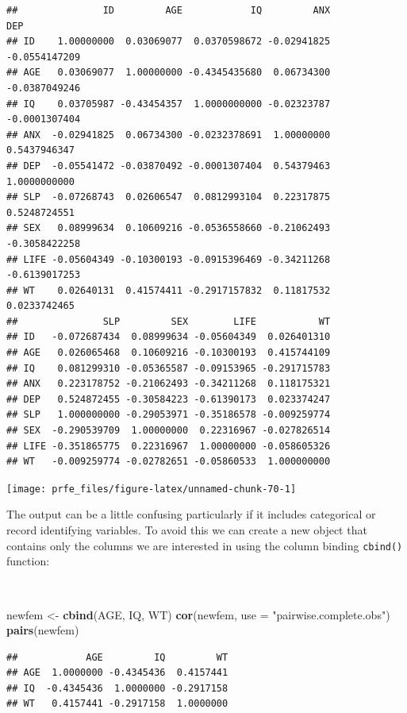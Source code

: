 \documentclass[12pt,a4paper]{book}
\newenvironment{Shaded}{\begin{snugshade}}{\end{snugshade}}
\newcommand{\DataTypeTok}[1]{\textcolor[rgb]{0.13,0.29,0.53}{#1}}
\newcommand{\KeywordTok}[1]{\textcolor[rgb]{0.13,0.29,0.53}{\textbf{#1}}}
\newcommand{\NormalTok}[1]{#1}
\newcommand{\StringTok}[1]{\textcolor[rgb]{0.31,0.60,0.02}{#1}}
\theoremstyle{definition}
\theoremstyle{definition}
\theoremstyle{definition}
\theoremstyle{remark}
\begin{document}
\begin{verbatim}
##               ID         AGE            IQ         ANX           DEP
## ID    1.00000000  0.03069077  0.0370598672 -0.02941825 -0.0554147209
## AGE   0.03069077  1.00000000 -0.4345435680  0.06734300 -0.0387049246
## IQ    0.03705987 -0.43454357  1.0000000000 -0.02323787 -0.0001307404
## ANX  -0.02941825  0.06734300 -0.0232378691  1.00000000  0.5437946347
## DEP  -0.05541472 -0.03870492 -0.0001307404  0.54379463  1.0000000000
## SLP  -0.07268743  0.02606547  0.0812993104  0.22317875  0.5248724551
## SEX   0.08999634  0.10609216 -0.0536558660 -0.21062493 -0.3058422258
## LIFE -0.05604349 -0.10300193 -0.0915396469 -0.34211268 -0.6139017253
## WT    0.02640131  0.41574411 -0.2917157832  0.11817532  0.0233742465
##               SLP         SEX        LIFE           WT
## ID   -0.072687434  0.08999634 -0.05604349  0.026401310
## AGE   0.026065468  0.10609216 -0.10300193  0.415744109
## IQ    0.081299310 -0.05365587 -0.09153965 -0.291715783
## ANX   0.223178752 -0.21062493 -0.34211268  0.118175321
## DEP   0.524872455 -0.30584223 -0.61390173  0.023374247
## SLP   1.000000000 -0.29053971 -0.35186578 -0.009259774
## SEX  -0.290539709  1.00000000  0.22316967 -0.027826514
## LIFE -0.351865775  0.22316967  1.00000000 -0.058605326
## WT   -0.009259774 -0.02782651 -0.05860533  1.000000000
\end{verbatim}

\newpage

\begin{center}\texttt{[image: prfe\_files/figure-latex/unnamed-chunk-70-1]} \end{center}

The output can be a little confusing particularly if it includes
categorical or record identifying variables. To avoid this we can create
a new object that contains only the columns we are interested in using
the column binding \texttt{cbind()} function:

~

\begin{Shaded}
\begin{Highlighting}[]
\NormalTok{newfem <-}\StringTok{ }\KeywordTok{cbind}\NormalTok{(AGE, IQ, WT)}
\KeywordTok{cor}\NormalTok{(newfem, }\DataTypeTok{use =} \StringTok{"pairwise.complete.obs"}\NormalTok{)}
\KeywordTok{pairs}\NormalTok{(newfem)}
\end{Highlighting}
\end{Shaded}

\begin{verbatim}
##            AGE         IQ         WT
## AGE  1.0000000 -0.4345436  0.4157441
## IQ  -0.4345436  1.0000000 -0.2917158
## WT   0.4157441 -0.2917158  1.0000000
\end{verbatim}
\end{document}
